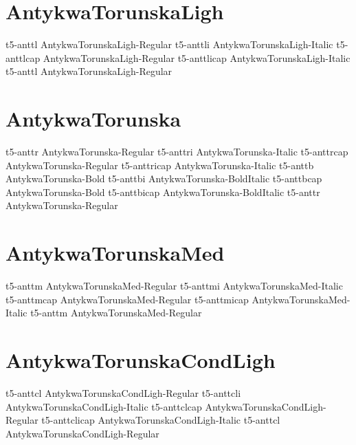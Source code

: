 \documentclass[sample]{vnsample}
\begin{document}
\section{AntykwaTorunskaLigh}
      {t5-anttl}      {AntykwaTorunskaLigh-Regular}
     {t5-anttli}     {AntykwaTorunskaLigh-Italic}
     {t5-anttlcap}   {AntykwaTorunskaLigh-Regular}
   {t5-anttlicap}  {AntykwaTorunskaLigh-Italic}
      {t5-anttl}      {AntykwaTorunskaLigh-Regular}

\section{AntykwaTorunska}
      {t5-anttr}      {AntykwaTorunska-Regular}
     {t5-anttri}     {AntykwaTorunska-Italic}
     {t5-anttrcap}   {AntykwaTorunska-Regular}
   {t5-anttricap}  {AntykwaTorunska-Italic}
      {t5-anttb}      {AntykwaTorunska-Bold}
     {t5-anttbi}     {AntykwaTorunska-BoldItalic}
     {t5-anttbcap}   {AntykwaTorunska-Bold}
   {t5-anttbicap}  {AntykwaTorunska-BoldItalic}
      {t5-anttr}      {AntykwaTorunska-Regular}

\section{AntykwaTorunskaMed}
     {t5-anttm}      {AntykwaTorunskaMed-Regular}
    {t5-anttmi}     {AntykwaTorunskaMed-Italic}
    {t5-anttmcap}   {AntykwaTorunskaMed-Regular}
  {t5-anttmicap}  {AntykwaTorunskaMed-Italic}
     {t5-anttm}      {AntykwaTorunskaMed-Regular}

\section{AntykwaTorunskaCondLigh}
     {t5-anttcl}     {AntykwaTorunskaCondLigh-Regular}
    {t5-anttcli}    {AntykwaTorunskaCondLigh-Italic}
    {t5-anttclcap}  {AntykwaTorunskaCondLigh-Regular}
  {t5-anttclicap} {AntykwaTorunskaCondLigh-Italic}
     {t5-anttcl}     {AntykwaTorunskaCondLigh-Regular}
\end{document}
